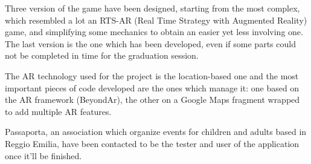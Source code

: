 \documentclass[
	twoside]				%
	{toptesi}				%
\begin{document}
	Three version of the game have been designed, starting from the most complex, which resembled a lot an RTS-AR (Real Time Strategy with Augmented Reality) game, and simplifying some mechanics to obtain an easier yet less involving one.
	The last version is the one which has been developed, even if some parts could not be completed in time for the graduation session.
	
	The AR technology used for the project is the location-based one and the most important pieces of code developed are the ones which manage it: one based on the AR framework (BeyondAr), the other on a Google Maps fragment wrapped to add multiple AR features.
	
	Passaporta, an association which organize events for children and adults based in Reggio Emilia, have been contacted to be the tester and user of the application once it'll be finished.
	
\end{document}

